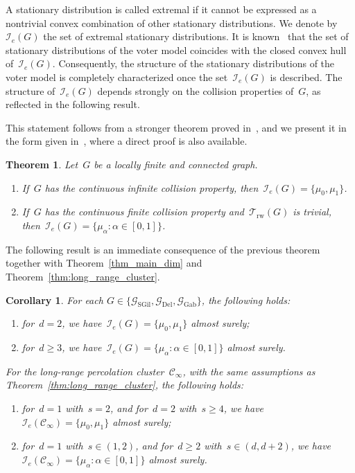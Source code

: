 \documentclass[a4paper,11pt]{article}
\newtheorem{theorem}{Theorem}
\newtheorem{corollary}{Corollary}
\theoremstyle{definition}
\begin{document}
A stationary distribution is called extremal if it cannot be expressed as a nontrivial convex combination of other stationary distributions. We denote by~$\mathscr I_e(G)$ the set of extremal stationary distributions. It is known~\cite[Proposition 1.8.c]{Liggett85} that the set of stationary distributions of the voter model coincides with the closed convex hull of~$\mathscr I_e(G)$. Consequently, the structure of the stationary distributions of the voter model is completely characterized once the set~$\mathscr I_e(G)$ is described. The structure of~$\mathscr I_e(G)$ depends strongly on the collision properties of~$G$, as reflected in the following result. 

This statement follows from a stronger theorem proved in~\cite[Theorem 1.8. Chapter~V]{Liggett85}, and we present it in the form given in~\cite[Theorem 2.2]{Astoquillca26}, where a direct proof is also available.

\begin{theorem}\label{thm_voter_model_stat_meas}
Let~$G$ be a locally finite and connected graph.
\begin{enumerate}
    \item If~$G$ has the continuous infinite collision property, then~$\mathscr I_e(G) = \{ \mu_0,\mu_1 \}$. 
    \item If~$G$ has the continuous finite collision property and~$\mathcal T_\mathrm{rw}(G)$ is trivial, then~$\mathscr I_e(G) = \{ \mu_\alpha: \alpha \in [0,1] \}$.
\end{enumerate}
\end{theorem}
The following result is an immediate consequence of the previous theorem together with Theorem~\ref{thm_main_dim} and Theorem~\ref{thm:long_range_cluster}.

\begin{corollary}\label{cor:vm}
For each $G \in \{ \mathcal G_\mathrm{SGil},\mathcal G_\mathrm{Del}, \mathcal G_\mathrm{Gab} \}$, the following holds:
\begin{enumerate}
    \item for~$d=2$, we have~$\mathscr I_e(G) = \{\mu_0,\mu_1\}$ almost surely;
    \item for~$d \ge 3$, we have~$\mathscr I_e(G) =  \{\mu_\alpha: \alpha \in [0,1]\}$ almost surely.
\end{enumerate}
For the long-range percolation cluster~$\mathcal C_\infty$, with the same assumptions as Theorem~\ref{thm:long_range_cluster}, the following holds:
\begin{enumerate}
    \item for~$d=1$ with~$s=2$, and for~$d=2$ with~$s \ge 4$, we have~$\mathscr I_e(\mathcal C_\infty) = \{ \mu_0, \mu_1 \}$ almost surely;
    \item for~$d = 1$ with~$s \in (1,2)$, and for~$d \ge 2$ with~$s \in (d, d+2)$, we have~$\mathscr I_e(\mathcal C_\infty) =  \{\mu_\alpha: \alpha \in [0,1]\}$ almost surely.
\end{enumerate}
\end{corollary}
\end{document}
